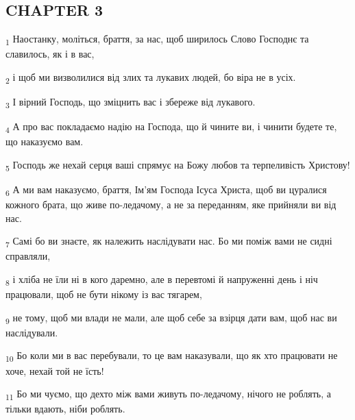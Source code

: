 \subsection{CHAPTER 3}
\begin{tcolorbox}
\textsubscript{1} Наостанку, моліться, браття, за нас, щоб ширилось Слово Господнє та славилось, як і в вас,
\end{tcolorbox}
\begin{tcolorbox}
\textsubscript{2} і щоб ми визволилися від злих та лукавих людей, бо віра не в усіх.
\end{tcolorbox}
\begin{tcolorbox}
\textsubscript{3} І вірний Господь, що зміцнить вас і збереже від лукавого.
\end{tcolorbox}
\begin{tcolorbox}
\textsubscript{4} А про вас покладаємо надію на Господа, що й чините ви, і чинити будете те, що наказуємо вам.
\end{tcolorbox}
\begin{tcolorbox}
\textsubscript{5} Господь же нехай серця ваші спрямує на Божу любов та терпеливість Христову!
\end{tcolorbox}
\begin{tcolorbox}
\textsubscript{6} А ми вам наказуємо, браття, Ім'ям Господа Ісуса Христа, щоб ви цуралися кожного брата, що живе по-ледачому, а не за переданням, яке прийняли ви від нас.
\end{tcolorbox}
\begin{tcolorbox}
\textsubscript{7} Самі бо ви знаєте, як належить наслідувати нас. Бо ми поміж вами не сидні справляли,
\end{tcolorbox}
\begin{tcolorbox}
\textsubscript{8} і хліба не їли ні в кого даремно, але в перевтомі й напруженні день і ніч працювали, щоб не бути нікому із вас тягарем,
\end{tcolorbox}
\begin{tcolorbox}
\textsubscript{9} не тому, щоб ми влади не мали, але щоб себе за взірця дати вам, щоб нас ви наслідували.
\end{tcolorbox}
\begin{tcolorbox}
\textsubscript{10} Бо коли ми в вас перебували, то це вам наказували, що як хто працювати не хоче, нехай той не їсть!
\end{tcolorbox}
\begin{tcolorbox}
\textsubscript{11} Бо ми чуємо, що дехто між вами живуть по-ледачому, нічого не роблять, а тільки вдають, ніби роблять.
\end{tcolorbox}
